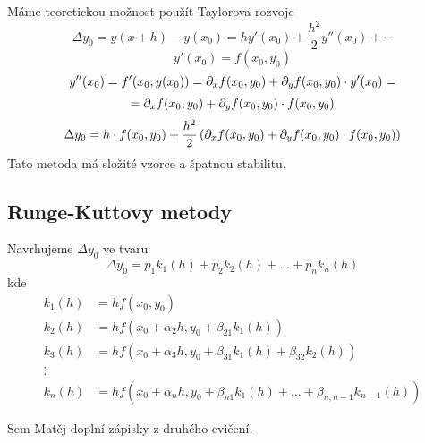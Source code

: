 	Máme teoretickou možnost použít Taylorova rozvoje
	$$ \Delta y_0 = y(x+h) - y(x_0) = hy'(x_0) + \frac{h^2}{2}y''(x_0) + \dotsb$$
	$$ y'(x_0) = f(x_0,y_0)$$
	$$ y''(x_0) = f'(x_0,y(x_0)) = \partial_x f(x_0,y_0) + \partial_y f(x_0,y_0)\cdot y'(x_0)=$$
	$$ = \partial_x f(x_0,y_0) + \partial_y f(x_0,y_0)\cdot f(x_0,y_0)$$
	$$ \Delta y_0 = h \cdot f(x_0,y_0) + \frac{h^2}{2}\left( \partial_x f(x_0,y_0) + \partial_y f(x_0,y_0)
	\cdot f(x_0,y_0) \right)$$
	Tato metoda má složité vzorce a špatnou stabilitu.
	
	\subsection{Runge-Kuttovy metody}
	
	Navrhujeme $\Delta y_0$ ve tvaru
	$$\Delta y_0 = p_1 k_1 (h) + p_2 k_2 (h) + \dots + p_n k_n (h)$$
	kde
	\vspace{-1ex}
	\begin{align*}
		k_1 (h) &= h f(x_0,y_0) \\
		k_2 (h) &= h f(x_0 + \alpha_2 h,y_0 + \beta_{21} k_1 (h)) \\
		k_3 (h) &= h f(x_0 + \alpha_3 h,y_0 + \beta_{31} k_1 (h) + \beta_{32} k_2 (h)) \\
		\vdots \\
		k_n (h) &= h f(x_0 + \alpha_n h,y_0 + \beta_{n1} k_1 (h) + \dots + \beta_{n,n-1}
		k_{n-1} (h))
	\end{align*}
	
	Sem Matěj doplní zápisky z druhého cvičení.
	

